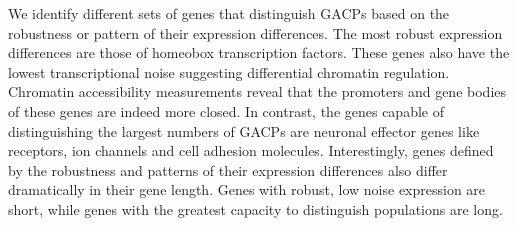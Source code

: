 
We identify different sets of genes that distinguish GACPs based on the robustness or pattern of their expression differences. The most robust expression differences are those of homeobox transcription factors. These genes also have the lowest transcriptional noise suggesting differential chromatin regulation. Chromatin accessibility measurements reveal that the promoters and gene bodies of these genes are indeed more closed. In contrast, the genes capable of distinguishing the largest numbers of GACPs are neuronal effector genes like receptors, ion channels and cell adhesion molecules. Interestingly, genes defined by the robustness and patterns of their expression differences also differ dramatically in their gene length. Genes with robust, low noise expression are short, while genes with the greatest capacity to distinguish populations are long. %


